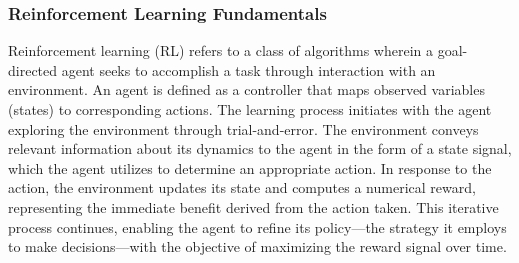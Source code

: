 \documentclass[conference]{IEEEtran}
\begin{document}
\subsubsection{Reinforcement Learning Fundamentals}
Reinforcement learning (RL) refers to a class of algorithms wherein a goal-directed agent seeks to accomplish a task through interaction with an environment. An agent is defined as a controller that maps observed variables (states) to corresponding actions. The learning process initiates with the agent exploring the environment through trial-and-error. The environment conveys relevant information about its dynamics to the agent in the form of a state signal, which the agent utilizes to determine an appropriate action. In response to the action, the environment updates its state and computes a numerical reward, representing the immediate benefit derived from the action taken. This iterative process continues, enabling the agent to refine its policy—the strategy it employs to make decisions—with the objective of maximizing the reward signal over time.
\end{document}
